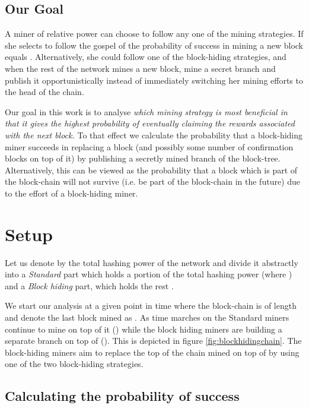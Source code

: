 \documentclass[letterpaper,12pt]{report}
\begin{document}
\section{Our Goal}\label{subsec:goal}

A miner of relative power  can choose to follow any one of the mining strategies. If she selects to follow the gospel of \cite{Bitcoin} the probability of success in mining a new block equals . Alternatively, she could follow one of the block-hiding strategies, and when the rest of the network mines a new block, mine a secret branch and publish it opportunistically instead of immediately switching her mining efforts to the head of the chain.  

Our goal in this work is to analyse \textit{which mining strategy is most beneficial in that it gives the highest probability of eventually claiming the rewards associated with the next block.} 
To that effect we calculate the probability that a block-hiding miner succeeds in replacing a block (and possibly some number of confirmation blocks on top of it) by publishing a secretly mined branch of the block-tree. Alternatively, this can be viewed as the probability that a block which is part of the block-chain will not survive (i.e. be part of the block-chain in the future) due to the effort of a block-hiding miner.

\chapter{Setup}\label{chap:calc}

Let us denote by  the total hashing power of the network and divide it abstractly into a \emph{Standard} part which holds a portion  of the total hashing power (where ) and a \emph{Block hiding} part, which holds the rest . 

We start our analysis at a given point in time where the block-chain is of length  and denote the last block mined as . As time marches on the Standard miners continue to mine on top of it () while the block hiding miners are building a separate branch on top of  (). This is depicted in figure \ref{fig:blockhidingchain}. The block-hiding miners aim to replace the top of the chain mined on top of  by using one of the two block-hiding strategies.


\section{Calculating the probability of success}
\end{document}
